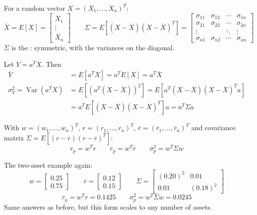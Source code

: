 For a random vector $X = (X_1, \dots, X_n)^T$:
\[\overline{X} = E[X] = \begin{bmatrix}\overline{X}_1\\ \vdots\\ \overline{X}_n\end{bmatrix} \qquad \Sigma = E\left[(X - \overline{X})(X - \overline{X})^T\right] = \begin{bmatrix}\sigma_{11} & \sigma_{12} & \cdots & \sigma_{1n}\\ \sigma_{21} & \sigma_{22} & \cdots & \sigma_{2n}\\ \vdots & & \ddots & \vdots\\ \sigma_{n1} & \sigma_{n2} & \cdots & \sigma_{nn}\end{bmatrix}\]
$\Sigma$ is the : symmetric, with the variances on the diagonal.

Let $Y = a^TX$. Then
\begin{align*}
    \overline{Y} &= E[a^TX] = a^TE[X] = a^T\overline{X}\\
    \sigma_Y^2 = \operatorname{Var}(a^TX) &= E\left[\left(a^T(X - \overline{X})\right)^2\right] = E\left[a^T(X - \overline{X})(X - \overline{X})^Ta\right]\\
    &= a^TE\left[(X - \overline{X})(X - \overline{X})^T\right]a = a^T\Sigma a
\end{align*}

With $w = (w_1, \dots, w_n)^T$, $r = (r_1, \dots, r_n)^T$, $\overline{r} = (\overline{r}_1, \dots, \overline{r}_n)^T$ and covariance matrix $\Sigma = E[(r - \overline{r})(r - \overline{r})^T]$:
\[\boxed{r_p = w^Tr \qquad \overline{r}_p = w^T\overline{r} \qquad \sigma_p^2 = w^T\Sigma w}\]

\begin{example}
    The two-asset example again:
    \[w = \begin{bmatrix}0.25\\ 0.75\end{bmatrix} \qquad \overline{r} = \begin{bmatrix}0.12\\ 0.15\end{bmatrix} \qquad \Sigma = \begin{bmatrix}(0.20)^2 & 0.01\\ 0.01 & (0.18)^2\end{bmatrix}\]
    \[\overline{r}_p = w^T\overline{r} = 0.1425 \qquad \sigma_p^2 = w^T\Sigma w = 0.0245\]
    Same answers as before, but this form scales to any number of assets.
\end{example}
